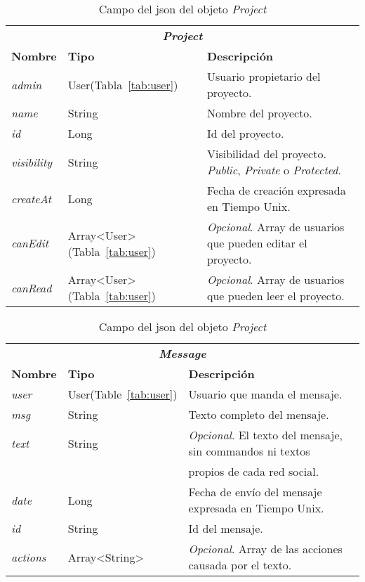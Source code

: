 \begin{table}[h]
\centering
\begin{tabular}{lll}
\multicolumn{3}{c}{\textit{\textbf{Project}}}                                              \\
\textbf{Nombre}     & \textbf{Tipo}   & \textbf{Descripción}                                 \\ \hline \hline
\textit{admin}      & User(Tabla~\ref{tab:user})            & Usuario propietario del proyecto.                    \\
\textit{name} 	    & String          & Nombre del proyecto.                             \\
\textit{id}         & Long            & Id del proyecto.									 \\
\textit{visibility} & String          & Visibilidad del proyecto. \textit{Public}, \textit{Private} o \textit{Protected}.    \\ 
\textit{createAt}	& Long			  & Fecha de creación expresada en Tiempo Unix.\\
\textit{canEdit}	& Array<User> (Tabla~\ref{tab:user})	  & \textit{Opcional}. Array de usuarios que pueden editar el proyecto.\\
\textit{canRead}	& Array<User> (Tabla~\ref{tab:user})	  & \textit{Opcional}. Array de usuarios que pueden leer el proyecto.\\
\hline
\end{tabular}
\caption{Campo del json del objeto \textit{Project}}
\label{tab:project}
\end{table}


\begin{table}[h]
\centering
\begin{tabular}{lll}
\multicolumn{3}{c}{\textit{\textbf{Message}}}                                                     \\
\textbf{Nombre}     & \textbf{Tipo}   & \textbf{Descripción}                                      \\ \hline \hline
\textit{user}       & User(Table~\ref{tab:user})            & Usuario que manda el mensaje.                             \\
\textit{msg} 	    & String          & Texto completo del mensaje.                               \\
\textit{text}       & String          & \textit{Opcional}. El texto del mensaje, sin commandos ni textos \\ 
					&				  & propios de cada red social. 			  \\
\textit{date}       & Long            & Fecha de envío del mensaje expresada en Tiempo Unix.      \\ 
\textit{id}	        & String		  & Id del mensaje.\\
\textit{actions}	& Array<String>	  & \textit{Opcional}. Array de las acciones causada por el texto. \\
\hline
\end{tabular}
\caption{Campo del json del objeto \textit{Project}}
\label{tab:Message}
\end{table}
